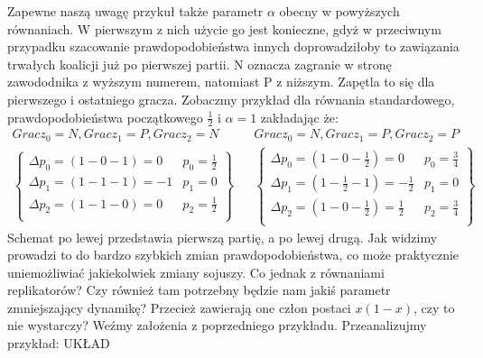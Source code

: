 Zapewne naszą uwagę przykuł także parametr $\alpha$ obecny w powyższych równaniach. W pierwszym z nich użycie go jest konieczne, gdyż w przeciwnym przypadku szacowanie prawdopodobieństwa innych doprowadziłoby to zawiązania trwałych koalicji już po pierwszej partii. N oznacza zagranie w stronę zawododnika z wyższym numerem, natomiast P z niższym. Zapętla to się dla pierwszego i ostatniego gracza. Zobaczmy przykład dla równania standardowego, prawdopodobieństwa początkowego $\frac{1}{2}$ i $\alpha = 1$ zakładając że:
\begin{align*}
Gracz_0 = N, Gracz_1 = P, Gracz_2 = N && Gracz_0 = N, Gracz_1 = P, Gracz_2 = P\\
\left\{
\begin{array}{ll}
\Delta p_0 = (1 - 0 - 1) =  0 & p_0=\frac{1}{2}\\
\Delta p_1 = (1 - 1 - 1) =  -1 & p_1= 0\\
\Delta p_2 = (1 - 1 - 0) =  0 & p_2=\frac{1}{2}\\
\end{array} 
\right\} &&
\left\{
\begin{array}{ll}
\Delta p_0 = (1 - 0 - \frac{1}{2}) =  0 & p_0=\frac{3}{4}\\
\Delta p_1 = (1 - \frac{1}{2} - 1) =  -\frac{1}{2} & p_1= 0\\
\Delta p_2 = (1 - 0 - \frac{1}{2}) =  \frac{1}{2} & p_2=\frac{3}{4}\\
\end{array}
\right\}
\end{align*}
Schemat po lewej przedstawia pierwszą partię, a po lewej drugą. Jak widzimy prowadzi to do bardzo szybkich zmian prawdopodobieństwa, co może praktycznie uniemożliwiać jakiekolwiek zmiany sojuszy. Co jednak z równaniami replikatorów? Czy również tam potrzebny będzie nam jakiś parametr zmniejszający dynamikę? Przecież zawierają one człon postaci $x(1-x)$, czy to nie wystarczy? Weźmy założenia z poprzedniego przykładu. Przeanalizujmy przykład: {\color{red} UKŁAD}
